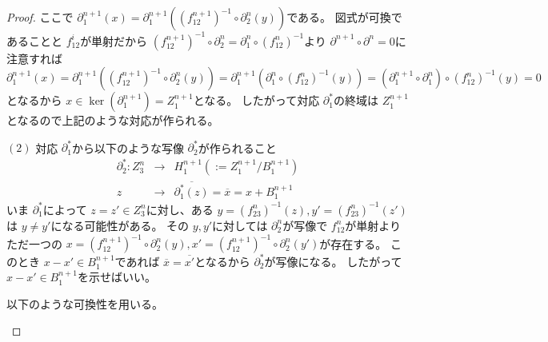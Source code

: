 \documentclass[dvipdfmx]{jsarticle}
\begin{document}
\begin{proof}
  ここで $\partial^{n+1}_1(x) = \partial^{n+1}_1((f_{12}^{n+1})^{-1} \circ \partial^n_2(y))$である。
  図式が可換であることと $f_{12}^i$が単射だから $(f_{12}^{n+1})^{-1} \circ \partial^n_2 = \partial^n_1 \circ (f_{12}^n)^{-1}$より
  $\partial^{n+1} \circ \partial^n = 0$に注意すれば
  $\partial^{n+1}_1(x) = \partial^{n+1}_1((f_{12}^{n+1})^{-1} \circ \partial^n_2(y)) = \partial^{n+1}_1(\partial^n_1 \circ (f_{12}^n)^{-1}(y)) = (\partial^{n+1}_1 \circ \partial^n_1) \circ (f_{12}^n)^{-1}(y) = 0$
  となるから $x \in \ker(\partial^{n+1}_1) = Z^{n+1}_1$となる。
  したがって対応 $\partial^*_1$の終域は $Z^{n+1}_1$となるので上記のような対応が作られる。

  $(2)$
  対応 $\partial^*_1$から以下のような写像 $\partial^*_2$が作られること
  \begin{eqnarray*}
    \partial^*_2 : Z^n_3 & \longrightarrow & H^{n+1}_1 (:= Z^{n+1}_1 / B^{n+1}_1) \\
    z & \longrightarrow & \overline{\partial^*_1(z)} = \overline{x} = x + B^{n+1}_1
  \end{eqnarray*}
  いま $\partial^*_1$によって $z = z' \in Z^n_3$に対し、ある $y = (f_{23}^n)^{-1}(z) , y' = (f_{23}^n)^{-1}(z')$は $y \neq y'$になる可能性がある。
  その $y , y'$に対しては $\partial^n_2$が写像で $f_{12}^n$が単射より
  ただ一つの $x = (f_{12}^{n+1})^{-1} \circ \partial^n_2(y) , x' = (f_{12}^{n+1})^{-1} \circ \partial^n_2(y')$が存在する。
  このとき $x - x' \in B^{n+1}_1$であれば $\overline{x} = \overline{x'}$となるから $\partial^*_2$が写像になる。
  したがって $x - x' \in B^{n+1}_1$を示せばいい。

  以下のような可換性を用いる。
  \begin{center}
  \end{center}


\end{proof}
\end{document}
